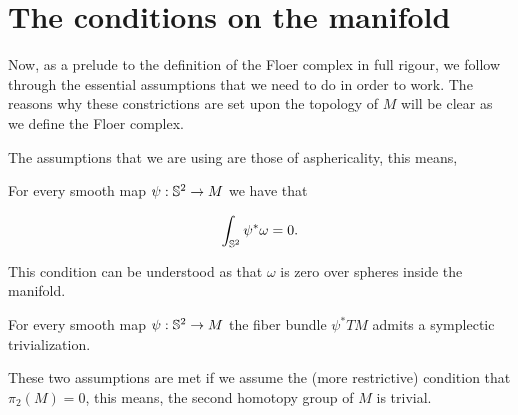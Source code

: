 \section{The conditions on the manifold}

Now, as a prelude to the definition of the Floer complex in full rigour, we follow through the essential assumptions that we need to do in order to work. The reasons why these constrictions are set upon the topology of $M$ will be clear as we define the Floer complex.

The assumptions that we are using are those of asphericality, this means,

\begin{assump} \label{assumption1}
For every smooth map $\psi : \mathbb{S}^2 \rightarrow M$ we have that

$$\int_{\mathbb{S}^2} \psi^{\ast} \omega = 0 .$$
\end{assump}

This condition can be understood as that $\omega$ is zero over spheres inside the manifold.

\begin{assump} \label{assumption2}
For every smooth map $\psi : \mathbb{S}^2 \rightarrow M$ the fiber bundle $\psi^{\ast} TM$ admits a symplectic trivialization.
\end{assump}

These two assumptions are met if we assume the (more restrictive) condition that $\pi_2(M) = 0$, this means, the second homotopy group of $M$ is trivial.
